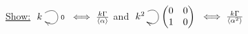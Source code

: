 \begin{exam}
\underline{Show:} $\xymatrix{k \ar@(ur,dr)^{0}} \iff \frac{k\G}{\langle\alpha\rangle}$ and $\xymatrix{k^2 \ar@(ur,dr)^{\begin{pmatrix}0&0\\1&0\end{pmatrix}}} \iff \frac{k\G}{\langle\alpha^2\rangle}$

	
	
\end{exam}
